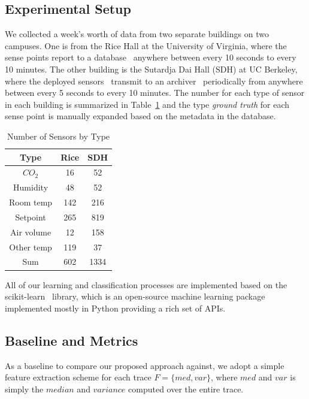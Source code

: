\subsection{Experimental Setup}
We collected a week's worth of data from two separate buildings on two campuses. One is from the Rice Hall at the University of Virginia, where 
the sense points report to a database~\cite{trane} anywhere between every 10 seconds to every 10 minutes. The other building is the Sutardja Dai Hall (SDH) at UC Berkeley, 
where the deployed sensors~\cite{keti, bacnet} transmit to an archiver~\cite{smap} periodically from anywhere between every 5 seconds to every 10 minutes. The number for each type 
of sensor in each building is summarized in Table~\ref{table:num} and the type \emph{ground truth} for each sense point is manually expanded based on the metadata in the database.

\begin{table}[ht!]
\centering %
\begin{tabular}{c c c}%
\hline %
Type & Rice & SDH \\ %
\hline\hline %
$CO_{2}$ & 16 & 52 \\ %
Humidity & 48 & 52 \\
Room temp & 142 & 216 \\
Setpoint & 265 & 819 \\
Air volume & 12 & 158 \\ 
Other temp & 119 & 37 \\ \hline
Sum & 602 & 1334 \\ \hline
\end{tabular}
\caption{Number of Sensors by Type}
\label{table:num} %
\end{table}

All of our learning and classification processes are implemented based on the scikit-learn~\cite{scikit} library, which is an open-source machine learning package 
implemented mostly in Python providing a rich set of APIs.%

\subsection{Baseline and Metrics}
\label{sec:baseline}
As a baseline to compare our proposed approach against, we adopt a simple feature extraction scheme for each trace $F=\{med, var\}$, where $med$ and $var$ is simply 
the $median$ and $variance$ computed over the entire trace.

